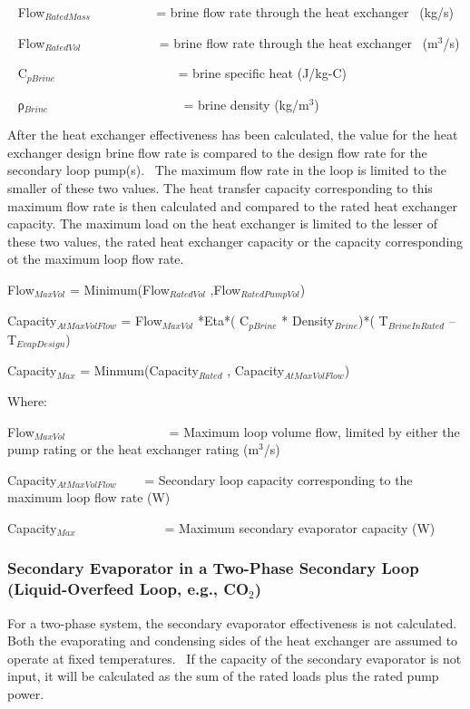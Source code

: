 ~ Flow\(_{RatedMass}\) ~~~~~~~~~ = brine flow rate through the heat exchanger~ (kg/s)

~ Flow\(_{RatedVol}\)~~ ~~~~~~~~~ = brine flow rate through the heat exchanger~ (m\(^{3}\)/s)

~ C\(_{pBrine}\)~~~~~~~~~~ ~~~~~~~~ = brine specific heat (J/kg-C)

~ ρ\(_{Brine}\)~ ~~~~~~~~~~~~~~~~~~~ = brine density (kg/m\(^{3}\))

After the heat exchanger effectiveness has been calculated, the value for the heat exchanger design brine flow rate is compared to the design flow rate for the secondary loop pump(s).~ The maximum flow rate in the loop is limited to the smaller of these two values. The heat transfer capacity corresponding to this maximum flow rate is then calculated and compared to the rated heat exchanger capacity. The maximum load on the heat exchanger is limited to the lesser of these two values, the rated heat exchanger capacity or the capacity corresponding ot the maximum loop flow rate.

Flow\(_{MaxVol}\) = Minimum(Flow\(_{RatedVol}\) ,Flow\(_{RatedPumpVol}\))

Capacity\(_{AtMaxVolFlow}\) = Flow\(_{MaxVol}\) *Eta*( C\(_{pBrine}\) * Density\(_{Brine}\))*( T\(_{BrineInRated}\) -- T\(_{EvapDesign}\))

Capacity\(_{Max}\) = Minmum(Capacity\(_{Rated}\) , Capacity\(_{AtMaxVolFlow}\))

Where:

Flow\(_{MaxVol}\)~ ~~~~~~~~~~~~~~ = Maximum loop volume flow, limited by either the pump rating or the heat exchanger rating (m\(^{3}\)/s)

Capacity\(_{AtMaxVolFlow}\) ~~~ = Secondary loop capacity corresponding to the maximum loop flow rate (W)

Capacity\(_{Max}\) ~~~~~~~~~~~ ~ = Maximum secondary evaporator capacity (W)

\subsubsection{\texorpdfstring{Secondary Evaporator in a Two-Phase Secondary Loop~ (Liquid-Overfeed Loop, e.g., CO\(_{2}\))}{Secondary Evaporator in a Two-Phase Secondary Loop~ (Liquid-Overfeed Loop, e.g., CO\_\{2\})}}\label{secondary-evaporator-in-a-two-phase-secondary-loop-liquid-overfeed-loop-e.g.-coux5f2}

For a two-phase system, the secondary evaporator effectiveness is not calculated. Both the evaporating and condensing sides of the heat exchanger are assumed to operate at fixed temperatures.~ If the capacity of the secondary evaporator is not input, it will be calculated as the sum of the rated loads plus the rated pump power.

